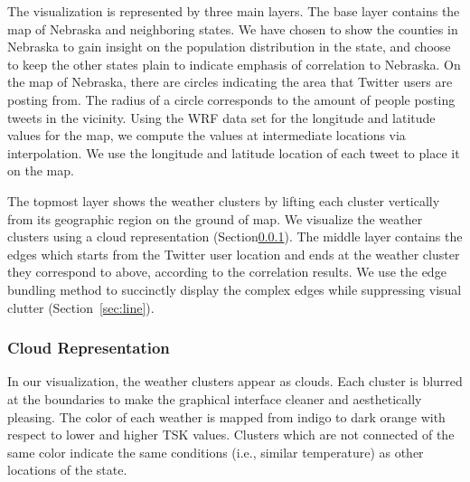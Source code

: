 The visualization is represented by three main layers. The base layer contains the map of Nebraska and neighboring states. We have chosen to show the counties in Nebraska to gain insight on the population distribution in the state, and choose to keep the other states plain to indicate emphasis of correlation to Nebraska. On the map of Nebraska, there are circles indicating the area that Twitter users are posting from. The radius of a circle corresponds to the amount of people posting tweets in the vicinity. Using the WRF data set for the longitude and latitude values for the map, we compute the values at intermediate locations via interpolation. We use the longitude and latitude location of each tweet to place it on the map.

The topmost layer shows the weather clusters by lifting each cluster vertically from its geographic region on the ground of map. We visualize the weather clusters using a cloud representation (Section\ref{sec:cloud}). The middle layer contains the edges which starts from the Twitter user location and ends at the weather cluster they correspond to above, according to the correlation results. We use the edge bundling method to succinctly display the complex edges while suppressing visual clutter (Section~\ref{sec:line}).

\subsubsection{Cloud Representation}
\label{sec:cloud}

In our visualization, the weather clusters appear as clouds. Each cluster is blurred at the boundaries to make the graphical interface cleaner and aesthetically pleasing. The color of each weather is mapped from indigo to dark orange with respect to lower and higher TSK values. Clusters which are not connected of the same color indicate the same conditions (i.e., similar temperature) as other locations of the state. %

